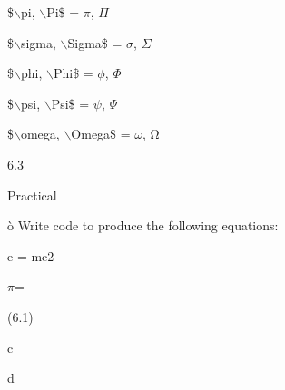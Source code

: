 \documentclass[a4paper,portrait,12pt]{article}
\begin{document}
\begin{flushleft}
\$\ensuremath{\backslash}pi, \ensuremath{\backslash}Pi\$ = $\pi$, $\Pi$
\end{flushleft}


\begin{flushleft}
\$\ensuremath{\backslash}sigma, \ensuremath{\backslash}Sigma\$ = $\sigma$, $\Sigma$
\end{flushleft}


\begin{flushleft}
\$\ensuremath{\backslash}phi, \ensuremath{\backslash}Phi\$ = $\phi$, $\Phi$
\end{flushleft}


\begin{flushleft}
\$\ensuremath{\backslash}psi, \ensuremath{\backslash}Psi\$ = $\psi$, $\Psi$
\end{flushleft}


\begin{flushleft}
\$\ensuremath{\backslash}omega, \ensuremath{\backslash}Omega\$ = $\omega$, Ω
\end{flushleft}





6.3





\begin{flushleft}
Practical
\end{flushleft}





\begin{flushleft}
\`{o} Write code to produce the following equations:
\end{flushleft}


\begin{flushleft}
e = mc2
\end{flushleft}


\begin{flushleft}
$\pi$=
\end{flushleft}





(6.1)





\begin{flushleft}
c
\end{flushleft}


\begin{flushleft}
d
\end{flushleft}
\end{document}
